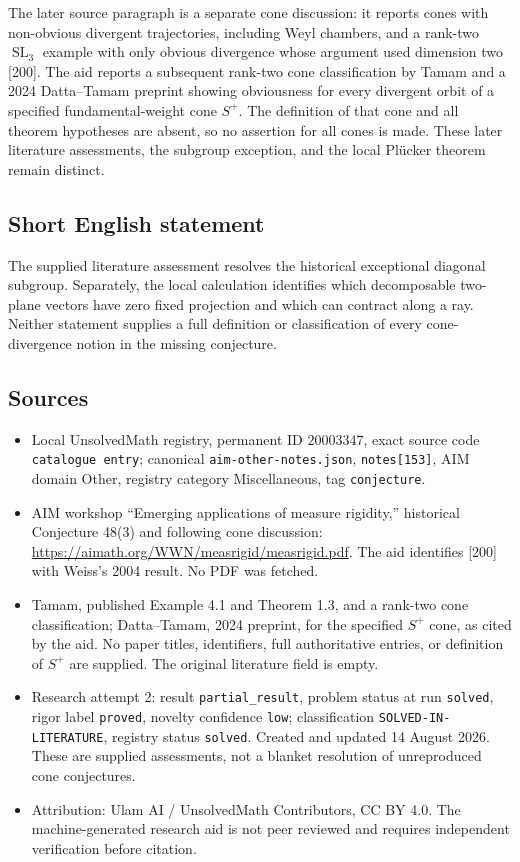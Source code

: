 \documentclass[11pt]{article}
\begin{document}
The later source paragraph is a separate cone discussion: it reports cones with non-obvious divergent trajectories, including Weyl chambers, and a rank-two \(\operatorname{SL}_3\) example with only obvious divergence whose argument used dimension two [200]. The aid reports a subsequent rank-two cone classification by Tamam and a 2024 Datta--Tamam preprint showing obviousness for every divergent orbit of a specified fundamental-weight cone \(S^+\). The definition of that cone and all theorem hypotheses are absent, so no assertion for all cones is made. These later literature assessments, the subgroup exception, and the local Pl\"ucker theorem remain distinct.
\subsection{Short English statement}
The supplied literature assessment resolves the historical exceptional diagonal subgroup. Separately, the local calculation identifies which decomposable two-plane vectors have zero fixed projection and which can contract along a ray. Neither statement supplies a full definition or classification of every cone-divergence notion in the missing conjecture.
\subsection{Sources}
\begin{itemize}
\item Local UnsolvedMath registry, permanent ID \(20003347\), exact source code \texttt{catalogue entry}; canonical \texttt{aim-other-notes.json}, \texttt{notes[153]}, AIM domain Other, registry category Miscellaneous, tag \texttt{conjecture}.
\item AIM workshop ``Emerging applications of measure rigidity,'' historical Conjecture 48(3) and following cone discussion: \url{https://aimath.org/WWN/measrigid/measrigid.pdf}. The aid identifies [200] with Weiss's 2004 result. No PDF was fetched.
\item Tamam, published Example 4.1 and Theorem 1.3, and a rank-two cone classification; Datta--Tamam, 2024 preprint, for the specified \(S^+\) cone, as cited by the aid. No paper titles, identifiers, full authoritative entries, or definition of \(S^+\) are supplied. The original literature field is empty.
\item Research attempt 2: result \texttt{partial\_result}, problem status at run \texttt{solved}, rigor label \texttt{proved}, novelty confidence \texttt{low}; classification \texttt{SOLVED-IN-LITERATURE}, registry status \texttt{solved}. Created and updated 14 August 2026. These are supplied assessments, not a blanket resolution of unreproduced cone conjectures.
\item Attribution: Ulam AI / UnsolvedMath Contributors, CC BY 4.0. The machine-generated research aid is not peer reviewed and requires independent verification before citation.
\end{itemize}
\end{document}
